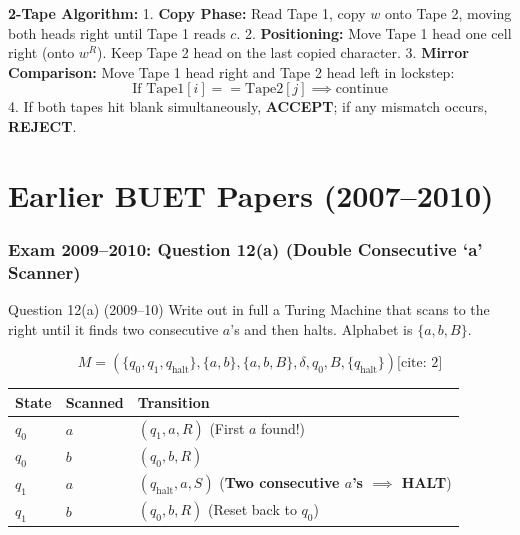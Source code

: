 \documentclass[11pt,a4paper]{article}
\begin{document}
\begin{solutionbox}
\textbf{2-Tape Algorithm:}
1. \textbf{Copy Phase:} Read Tape 1, copy $w$ onto Tape 2, moving both heads right until Tape 1 reads $c$.
2. \textbf{Positioning:} Move Tape 1 head one cell right (onto $w^R$). Keep Tape 2 head on the last copied character.
3. \textbf{Mirror Comparison:} Move Tape 1 head right and Tape 2 head left in lockstep:
   $$\text{If } \text{Tape1}[i] == \text{Tape2}[j] \implies \text{continue}$$
4. If both tapes hit blank simultaneously, \textbf{ACCEPT}; if any mismatch occurs, \textbf{REJECT}.
\end{solutionbox}

\part{Earlier BUET Papers (2007--2010)}

\section{Exam 2009--2010: Question 12(a) (Double Consecutive `a' Scanner)}
\begin{questionbox}{Question 12(a) (2009--10)}
Write out in full a Turing Machine that scans to the right until it finds two consecutive $a$'s and then halts. Alphabet is $\{a, b, B\}$.
\end{questionbox}

\begin{solutionbox}
$$M = (\{q_0, q_1, q_{\text{halt}}\}, \{a, b\}, \{a, b, B\}, \delta, q_0, B, \{q_{\text{halt}}\}) \text{[cite: 2]}$$
\begin{center}
\small
\begin{tabular}{lll}
\toprule
\textbf{State} & \textbf{Scanned} & \textbf{Transition} \\
\midrule
$q_0$ & $a$ & $(q_1, a, R)$ (First $a$ found!) \\
$q_0$ & $b$ & $(q_0, b, R)$ \\
$q_1$ & $a$ & $(q_{\text{halt}}, a, S)$ (\textbf{Two consecutive $a$'s $\implies$ HALT}) \\
$q_1$ & $b$ & $(q_0, b, R)$ (Reset back to $q_0$) \\
\bottomrule
\end{tabular}
\end{center}
\end{solutionbox}
\end{document}

